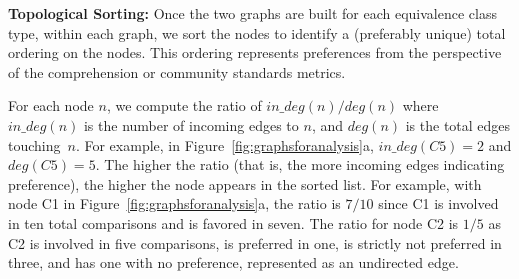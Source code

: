 \textbf{Topological Sorting:}
Once the two graphs are built for each equivalence class type, within each graph, we sort the nodes to identify a (preferably unique) total ordering on the nodes. This ordering represents preferences from the perspective of the comprehension or community standards metrics.

For each node $n$, we compute the ratio of $in\_deg(n) / deg(n)$ where $in\_deg(n)$ is the number of incoming edges to $n$, and $deg(n)$ is the total edges touching~$n$. For example, in Figure~\ref{fig:graphsforanalysis}a, $in\_deg(C5) = 2$ and $deg(C5) = 5$.
The higher the ratio (that is, the more incoming edges indicating preference), the higher the node appears in the sorted list. For example, with node C1 in Figure~\ref{fig:graphsforanalysis}a, the ratio is $7 / 10$ since C1 is involved in ten total comparisons and is favored in seven. The ratio for node C2 is $1 / 5$ as C2 is involved in five comparisons, is preferred in one, is strictly not preferred in three, and has one with no preference, represented as an undirected edge.


